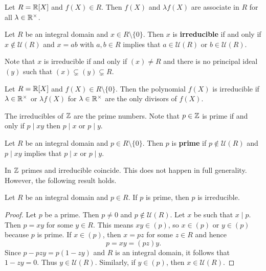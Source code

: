 \begin{example}
	Let $R=\mathbb{R}[X]$ and $f(X)\in R$. Then $f(X)$ and $\lambda f(X)$ are 
	associate in $R$ for all $\lambda\in\mathbb{R}^{\times}$. 	
\end{example}

\begin{definition}
	Let $R$ be an integral domain and $x\in R\setminus\{0\}$. Then $x$ is \textbf{irreducible} 
	if and only if $x\not\in\mathcal{U}(R)$ 
	and $x=ab$ with $a,b\in R$ implies that $a\in\mathcal{U}(R)$ or $b\in\mathcal{U}(R)$. 
\end{definition}

Note that $x$ is irreducible if and only if $(x)\ne R$ 
and there is no principal ideal $(y)$ such that 
$(x)\subsetneq (y)\subsetneq R$.

\begin{example}
	Let $R=\mathbb{R}[X]$ and $f(X)\in R\setminus\{0\}$. Then the polynomial $f(X)$ is irreducible if 
	$\lambda\in\mathbb{R}^{\times}$ or $\lambda f(X)$ for $\lambda\in\mathbb{R}^{\times}$ 
	are the only divisors
	of $f(X)$.  
\end{example}

The irreducibles of $\mathbb{Z}$ are the prime numbers. Note that $p\in \mathbb{Z}$
is prime if and only if $p\mid xy$ then $p\mid x$ or $p\mid y$. 

\begin{definition}
	Let $R$ be an integral domain and $p\in R\setminus\{0\}$. Then  
	$p$ is \textbf{prime} if $p\not\in\mathcal{U}(R)$ and 
	$p\mid xy$ implies that $p\mid x$ or $p\mid y$. 
\end{definition}

In $\mathbb{Z}$ primes and irreducible coincide. This does not happen in full generality. However,
the following result holds. 

\begin{proposition}
	Let $R$ be an integral domain and $p\in R$. 
	If $p$ is prime, then $p$ is irreducible. 
\end{proposition}

\begin{proof}
	Let $p$ be a prime. Then $p\ne 0$ and $p\not\in\mathcal{U}(R)$. Let $x$ be such that
	$x\mid p$. Then $p=xy$ for some $y\in R$. This means $xy\in (p)$, 
	so $x\in (p)$ or $y\in (p)$ because
	$p$ is prime. If $x\in (p)$, then $x=pz$ for some $z\in R$ and hence
	\[
	p=xy=(pz)y.
	\]
	Since $p-pzy=p(1-zy)$ and $R$ is an integral domain, it follows that 
	$1-zy=0$. Thus $y\in\mathcal{U}(R)$. Similarly, if $y\in (p)$, then 
	$x\in\mathcal{U}(R)$. 
\end{proof}

